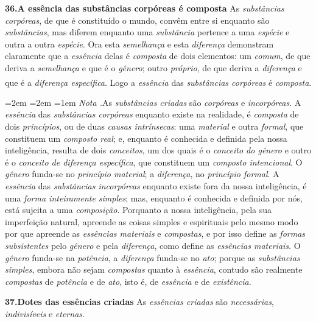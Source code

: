 \documentclass[12pt,a4paper]{article}
\newcommand{\tese}[2]{\bigskip\noindent\textbf{#1.\quad #2}\;\textemdash\;}
\renewcommand\footnote[1]{%
    \stepcounter{footnote}\textsuperscript{\thefootnote}%
    \par
    {\footnotesize
     \leftskip=2em \rightskip=2em \parindent=1em
     \addvspace{\medskipamount}%
     \noindent\textit{Nota \thefootnote.}\enspace #1\par
     \addvspace{\medskipamount}}%
  }
\begin{document}
\tese{36}{A essência das substâncias corpóreas é composta} As \emph{substâncias
corpóreas}, de que é constituído o mundo, convêm entre si enquanto são
\emph{substâncias}, mas diferem enquanto uma \emph{substância} pertence a uma
\emph{espécie} e outra a outra \emph{espécie}. Ora esta \emph{semelhança} e esta
\emph{diferença} demonstram claramente que a \emph{essência} delas é
\emph{composta} de dois elementos: um \emph{comum}, de que deriva a
\emph{semelhança} e que é o \emph{gênero}; outro \emph{próprio}, de que deriva a
\emph{diferença} e que é a \emph{diferença específica}. Logo a \emph{essência}
das \emph{substâncias corpóreas} é \emph{composta}.\footnote{As
\emph{substâncias criadas} são \emph{corpóreas} e \emph{incorpóreas}. A
\emph{essência} das \emph{substâncias corpóreas} \textemdash{} enquanto existe
na realidade, é \emph{composta} de dois \emph{princípios}, ou de duas
\emph{causas intrínsecas}: uma \emph{material} e outra \emph{formal}, que
constituem um \emph{composto real}; \textemdash{} e, enquanto é conhecida e
definida pela nossa inteligência, resulta de dois \emph{conceitos}, um dos quais
é o \emph{conceito do gênero} e outro é o \emph{conceito de diferença
específica}, que constituem um \emph{composto intencional}. O \emph{gênero}
funda-se no \emph{princípio material}; a \emph{diferença}, no \emph{princípio
formal}. \textemdash{} A \emph{essência} das \emph{substâncias incorpóreas}
\textemdash{} enquanto existe fora da nossa inteligência, é uma \emph{forma
inteiramente simples}; \textemdash{} mas, enquanto é conhecida e definida por
nós, está sujeita a uma \emph{composição}. Porquanto a nossa inteligência, pela
sua imperfeição natural, apreende as coisas simples e espirituais pelo mesmo
modo por que apreende as \emph{essências materiais} e \emph{compostas}, e por
isso define as \emph{formas subsistentes} pelo \emph{gênero} e pela
\emph{diferença}, como define as \emph{essências materiais}. O \emph{gênero}
funda-se na \emph{potência}, a \emph{diferença} funda-se no \emph{ato}; porque
as \emph{substâncias simples}, embora não sejam \emph{compostas} quanto à
\emph{essência}, contudo são realmente \emph{compostas} de \emph{potência} e de
\emph{ato}, isto é, de \emph{essência} e de \emph{existência}.}

\tese{37}{Dotes das essências criadas} As \emph{essências criadas} são
\emph{necessárias}, \emph{indivisíveis} e \emph{eternas}.
\end{document}
